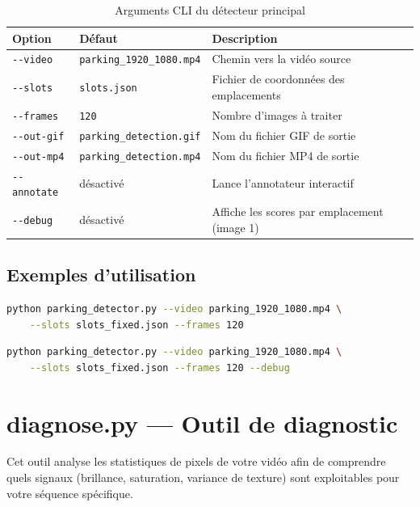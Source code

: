 \documentclass[12pt,a4paper]{report}
\begin{document}
\begin{table}[h!]
  \centering
  \caption{Arguments CLI du détecteur principal}
  \begin{tabularx}{\textwidth}{llX}
    \toprule
    \textbf{Option} & \textbf{Défaut} & \textbf{Description} \\
    \midrule
    \texttt{-{}-video}   & \texttt{parking\_1920\_1080.mp4} & Chemin vers la vidéo source \\
    \texttt{-{}-slots}   & \texttt{slots.json}             & Fichier de coordonnées des emplacements \\
    \texttt{-{}-frames}  & \texttt{120}                    & Nombre d'images à traiter \\
    \texttt{-{}-out-gif} & \texttt{parking\_detection.gif} & Nom du fichier GIF de sortie \\
    \texttt{-{}-out-mp4} & \texttt{parking\_detection.mp4} & Nom du fichier MP4 de sortie \\
    \texttt{-{}-annotate}& désactivé                       & Lance l'annotateur interactif \\
    \texttt{-{}-debug}   & désactivé                       & Affiche les scores par emplacement (image 1) \\
    \bottomrule
  \end{tabularx}
\end{table}

\subsection{Exemples d'utilisation}

\begin{lstlisting}[language=bash, numbers=none, caption={Exécution standard}]
python parking_detector.py --video parking_1920_1080.mp4 \
    --slots slots_fixed.json --frames 120
\end{lstlisting}

\begin{lstlisting}[language=bash, numbers=none, caption={Exécution avec débogage}]
python parking_detector.py --video parking_1920_1080.mp4 \
    --slots slots_fixed.json --frames 120 --debug
\end{lstlisting}

\section{diagnose.py — Outil de diagnostic}

Cet outil analyse les statistiques de pixels de votre vidéo afin de comprendre quels signaux (brillance, saturation, variance de texture) sont exploitables pour votre séquence spécifique.
\end{document}

